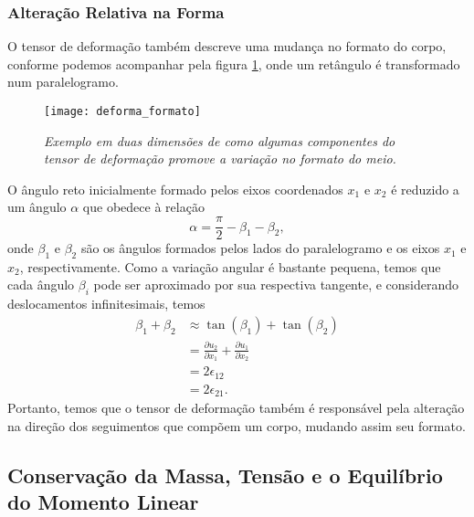 \subsubsection{Altera\c{c}\~ao Relativa na Forma}

O tensor de deforma\c{c}\~ao tamb\'em descreve uma mudan\c{c}a no formato do corpo, conforme podemos acompanhar pela figura \ref{fig.deforma_formato}, onde um ret\^angulo \'e transformado num paralelogramo. 
\begin{figure}
\centering
\texttt{[image: deforma\_formato]}
\caption{\textit{Exemplo em duas dimens\~oes de como algumas componentes do tensor de deforma\c{c}\~ao promove a varia\c{c}\~ao no formato do meio.}}
\label{fig.deforma_formato}
\end{figure}
O \^angulo reto inicialmente formado pelos eixos coordenados $x_1$ e $x_2$ \'e reduzido a um \^angulo $\alpha$ que obedece \`a rela\c{c}\~ao
\begin{equation*}
\alpha=\frac{\pi}{2}-\beta_1-\beta_2,
\end{equation*}
onde $\beta_1$ e $\beta_2$ s\~ao os \^angulos formados pelos lados do paralelogramo e os eixos $x_1$ e $x_2$, respectivamente. Como a varia\c{c}\~ao angular \'e bastante pequena, temos que cada \^angulo $\beta_i$ pode ser aproximado por sua respectiva tangente, e considerando deslocamentos infinitesimais, temos
\begin{align*}
\beta_1+\beta_2&\approx\tan(\beta_1)+\tan(\beta_2)\\
&=\frac{\partial u_2}{\partial x_1}+\frac{\partial u_1}{\partial x_2}\\
&=2\epsilon_{12}\\
&=2\epsilon_{21}.
\end{align*}
Portanto, temos que o tensor de deforma\c{c}\~ao tamb\'em \'e respons\'avel pela altera\c{c}\~ao na dire\c{c}\~ao dos seguimentos que comp\~oem um corpo, mudando assim seu formato.


\subsection{Conserva\c{c}\~ao da Massa, Tens\~ao e o Equil\'ibrio do Momento Linear}\label{sec.massa_tensao_momen_lin}

